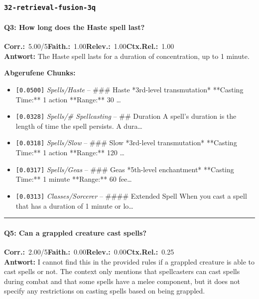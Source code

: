 \subsubsection*{\texttt{32-retrieval-fusion-3q}}
\label{app:samples:32_retrieval_fusion_3q}

\paragraph{Q3: How long does the Haste spell last?}
\noindent \textbf{Corr.:}~5.00/5\quad \textbf{Faith.:}~1.00\quad \textbf{Relev.:}~1.00\quad \textbf{Ctx.Rel.:}~1.00\\

\noindent\textbf{Antwort:} The Haste spell lasts for a duration of concentration, up to 1 minute.

\noindent\textbf{Abgerufene Chunks:}
\begin{itemize}[noitemsep, topsep=2pt]
  \item[\textbf{\#1}] \texttt{[0.0500]} \textit{Spells/Haste} -- \#\#\# Haste  *3rd-level transmutation*  **Casting Time:** 1 action  **Range:** 30 \ldots
  \item[\textbf{\#2}] \texttt{[0.0328]} \textit{Spells/# Spellcasting} -- \#\# Duration  A spell's duration is the length of time the spell persists. A dura\ldots
  \item[\textbf{\#3}] \texttt{[0.0318]} \textit{Spells/Slow} -- \#\#\# Slow  *3rd-level transmutation*  **Casting Time:** 1 action  **Range:** 120 \ldots
  \item[\textbf{\#4}] \texttt{[0.0317]} \textit{Spells/Geas} -- \#\#\# Geas  *5th-level enchantment*  **Casting Time:** 1 minute  **Range:** 60 fee\ldots
  \item[\textbf{\#5}] \texttt{[0.0313]} \textit{Classes/Sorcerer} -- \#\#\#\# Extended Spell  When you cast a spell that has a duration of 1 minute or lo\ldots
\end{itemize}
\vspace{4pt}
\hrule
\vspace{6pt}

\paragraph{Q5: Can a grappled creature cast spells?}
\noindent \textbf{Corr.:}~2.00/5\quad \textbf{Faith.:}~0.00\quad \textbf{Relev.:}~0.00\quad \textbf{Ctx.Rel.:}~0.25\\

\noindent\textbf{Antwort:} I cannot find this in the provided rules if a grappled creature is able to cast spells or not. The context only mentions that spellcasters can cast spells during combat and that some spells have a melee component, but it does not specify any restrictions on casting spells based on being grappled.

